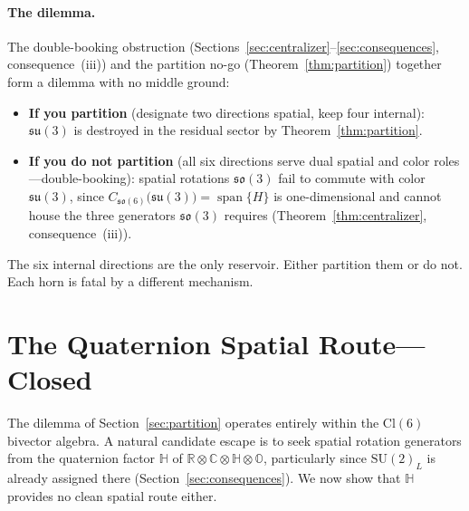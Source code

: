 \documentclass[aip,jmp,amsmath,amssymb,reprint,author-year]{revtex4-2}
\begin{document}
\paragraph{The dilemma.}
The double-booking obstruction (Sections~\ref{sec:centralizer}--\ref{sec:consequences}, consequence~(iii)) and the partition no-go
(Theorem~\ref{thm:partition}) together form a dilemma with no middle
ground:

\begin{itemize}
\item \textbf{If you partition} (designate two directions spatial, keep
  four internal): $\mathfrak{su}(3)$ is destroyed in the residual sector
  by Theorem~\ref{thm:partition}.
\item \textbf{If you do not partition} (all six directions serve dual
  spatial and color roles---double-booking): spatial rotations
  $\mathfrak{so}(3)$ fail to commute with color $\mathfrak{su}(3)$, since
  $C_{\mathfrak{so}(6)}\!\bigl(\mathfrak{su}(3)\bigr) =
  \operatorname{span}\{H\}$ is one-dimensional and cannot house the three
  generators $\mathfrak{so}(3)$ requires
  (Theorem~\ref{thm:centralizer}, consequence~(iii)).
\end{itemize}

The six internal directions are the only reservoir.  Either partition them
or do not.  Each horn is fatal by a different mechanism.

\section{The Quaternion Spatial Route---Closed}
\label{sec:quaternion}

The dilemma of Section~\ref{sec:partition} operates entirely within the
$\mathrm{Cl}(6)$ bivector algebra.  A natural candidate escape is to seek
spatial rotation generators from the quaternion factor $\mathbb{H}$ of
$\mathbb{R} \otimes \mathbb{C} \otimes \mathbb{H} \otimes \mathbb{O}$,
particularly since $\mathrm{SU}(2)_L$ is already assigned there
(Section~\ref{sec:consequences}).  We now show that $\mathbb{H}$ provides
no clean spatial route either.
\end{document}
